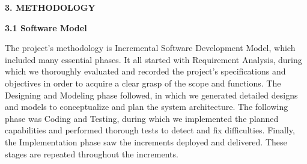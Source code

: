 \documentclass[a4paper,12pt]{article}
\begin{document}
{{{        
	
		\newpage
								
		\begin{flushleft}
			\fontsize{14}{16}\selectfont\textbf{3. METHODOLOGY}
			\label{page6}
		\end{flushleft}
								
		\begin{flushleft}
			\fontsize{13}{15}\selectfont\textbf{3.1 Software Model}
			\phantomsection
			\label{SDLC}
		\end{flushleft}
								
		The project's methodology is Incremental Software Development Model, which included many essential phases. It all started with Requirement Analysis, during which we thoroughly evaluated and recorded the project's specifications and objectives in order to acquire a clear grasp of the scope and functions. The Designing and Modeling phase followed, in which we generated detailed designs and models to conceptualize and plan the system architecture. The following phase was Coding and Testing, during which we implemented the planned capabilities and performed thorough tests to detect and fix difficulties. Finally, the Implementation phase saw the increments deployed and delivered. These stages are repeated throughout the increments.
				
				
								
}}}
\end{document}
